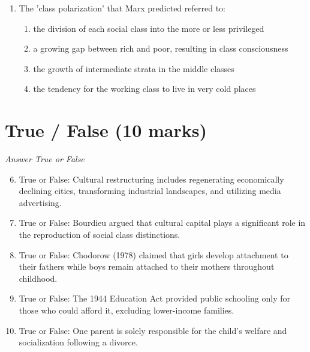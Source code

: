 \documentclass[12pt]{article}
\begin{document}
\begin{enumerate}[label=\arabic*.]
\begin{enumerate}[label=(\alph*)]
    \item content analysis is the best way to identify the themes covered by the media
    \item audiences passively absorb whatever messages they are given
    \item social interaction reinforces the ideas and images that audiences select
\end{enumerate}
\item The 'class polarization' that Marx predicted referred to:
\begin{enumerate}[label=(\alph*)]
    \item the division of each social class into the more or less privileged
    \item a growing gap between rich and poor, resulting in class consciousness
    \item the growth of intermediate strata in the middle classes
    \item the tendency for the working class to live in very cold places
\end{enumerate}
\end{enumerate}

\section*{True / False (10 marks)}
\textit{Answer True or False}
\begin{enumerate}[label=\arabic*.]
\setcounter{enumi}{5}
\item True or False: Cultural restructuring includes regenerating economically declining cities, transforming industrial landscapes, and utilizing media advertising.
\item True or False: Bourdieu argued that cultural capital plays a significant role in the reproduction of social class distinctions.
\item True or False: Chodorow (1978) claimed that girls develop attachment to their fathers while boys remain attached to their mothers throughout childhood.
\item True or False: The 1944 Education Act provided public schooling only for those who could afford it, excluding lower-income families.
\item True or False: One parent is solely responsible for the child's welfare and socialization following a divorce.
\end{enumerate}
\end{document}
